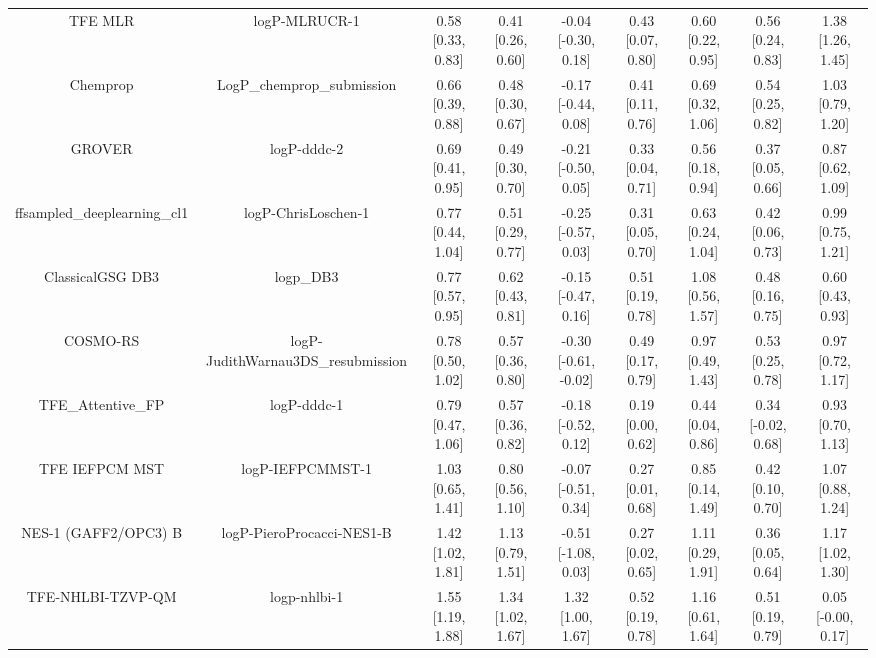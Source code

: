 \documentclass{article}
\begin{document}
\begin{center}
\begin{longtable}{|ccccccccc|}
\bottomrule
\endlastfoot
                   TFE MLR &                              logP-MLRUCR-1 & 0.58 [0.33, 0.83] & 0.41 [0.26, 0.60] &  -0.04 [-0.30, 0.18] & 0.43 [0.07, 0.80] &    0.60 [0.22, 0.95] &    0.56 [0.24, 0.83] &    1.38 [1.26, 1.45] \\
                  Chemprop &                 LogP\_chemprop\_submission & 0.66 [0.39, 0.88] & 0.48 [0.30, 0.67] &  -0.17 [-0.44, 0.08] & 0.41 [0.11, 0.76] &    0.69 [0.32, 1.06] &    0.54 [0.25, 0.82] &    1.03 [0.79, 1.20] \\
                    GROVER &                                logP-dddc-2 & 0.69 [0.41, 0.95] & 0.49 [0.30, 0.70] &  -0.21 [-0.50, 0.05] & 0.33 [0.04, 0.71] &    0.56 [0.18, 0.94] &    0.37 [0.05, 0.66] &    0.87 [0.62, 1.09] \\
ffsampled_deeplearning_cl1 &                        logP-ChrisLoschen-1 & 0.77 [0.44, 1.04] & 0.51 [0.29, 0.77] &  -0.25 [-0.57, 0.03] & 0.31 [0.05, 0.70] &    0.63 [0.24, 1.04] &    0.42 [0.06, 0.73] &    0.99 [0.75, 1.21] \\
          ClassicalGSG DB3 &                                  logp\_DB3 & 0.77 [0.57, 0.95] & 0.62 [0.43, 0.81] &  -0.15 [-0.47, 0.16] & 0.51 [0.19, 0.78] &    1.08 [0.56, 1.57] &    0.48 [0.16, 0.75] &    0.60 [0.43, 0.93] \\
                  COSMO-RS &         logP-JudithWarnau3DS\_resubmission & 0.78 [0.50, 1.02] & 0.57 [0.36, 0.80] & -0.30 [-0.61, -0.02] & 0.49 [0.17, 0.79] &    0.97 [0.49, 1.43] &    0.53 [0.25, 0.78] &    0.97 [0.72, 1.17] \\
          TFE_Attentive_FP &                                logP-dddc-1 & 0.79 [0.47, 1.06] & 0.57 [0.36, 0.82] &  -0.18 [-0.52, 0.12] & 0.19 [0.00, 0.62] &    0.44 [0.04, 0.86] &   0.34 [-0.02, 0.68] &    0.93 [0.70, 1.13] \\
            TFE IEFPCM MST &                           logP-IEFPCMMST-1 & 1.03 [0.65, 1.41] & 0.80 [0.56, 1.10] &  -0.07 [-0.51, 0.34] & 0.27 [0.01, 0.68] &    0.85 [0.14, 1.49] &    0.42 [0.10, 0.70] &    1.07 [0.88, 1.24] \\
      NES-1 (GAFF2/OPC3) B &                  logP-PieroProcacci-NES1-B & 1.42 [1.02, 1.81] & 1.13 [0.79, 1.51] &  -0.51 [-1.08, 0.03] & 0.27 [0.02, 0.65] &    1.11 [0.29, 1.91] &    0.36 [0.05, 0.64] &    1.17 [1.02, 1.30] \\
         TFE-NHLBI-TZVP-QM &                               logp-nhlbi-1 & 1.55 [1.19, 1.88] & 1.34 [1.02, 1.67] &    1.32 [1.00, 1.67] & 0.52 [0.19, 0.78] &    1.16 [0.61, 1.64] &    0.51 [0.19, 0.79] &   0.05 [-0.00, 0.17] \\

\end{longtable}
\end{center}
\end{document}
